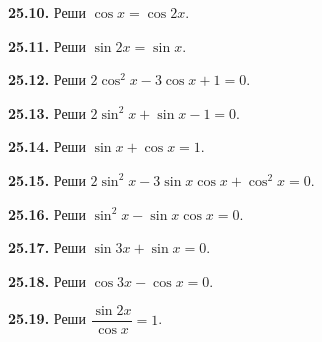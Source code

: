 \noindent\begin{minipage}[t]{\linewidth}\textbf{25.10.}\starmark{} Реши \(\cos x=\cos2x\).\par\end{minipage}\par
\noindent\begin{minipage}[t]{\linewidth}\textbf{25.11.}\starmark{} Реши \(\sin2x=\sin x\).\par\end{minipage}\par
\noindent\begin{minipage}[t]{\linewidth}\textbf{25.12.} Реши \(2\cos^2x-3\cos x+1=0\).\par\end{minipage}\par
\noindent\begin{minipage}[t]{\linewidth}\textbf{25.13.} Реши \(2\sin^2x+\sin x-1=0\).\par\end{minipage}\par
\noindent\begin{minipage}[t]{\linewidth}\textbf{25.14.} Реши \(\sin x+\cos x=1\).\par\end{minipage}\par
\noindent\begin{minipage}[t]{\linewidth}\textbf{25.15.}\starmark{} Реши \(2\sin^2x-3\sin x\cos x+\cos^2x=0\).\par\end{minipage}\par
\noindent\begin{minipage}[t]{\linewidth}\textbf{25.16.} Реши \(\sin^2x-\sin x\cos x=0\).\par\end{minipage}\par
\noindent\begin{minipage}[t]{\linewidth}\textbf{25.17.}\starmark{} Реши \(\sin3x+\sin x=0\).\par\end{minipage}\par
\noindent\begin{minipage}[t]{\linewidth}\textbf{25.18.}\starmark{} Реши \(\cos3x-\cos x=0\).\par\end{minipage}\par
\noindent\begin{minipage}[t]{\linewidth}\textbf{25.19.}\starmark{} Реши \(\dfrac{\sin2x}{\cos x}=1\).\par\end{minipage}\par
